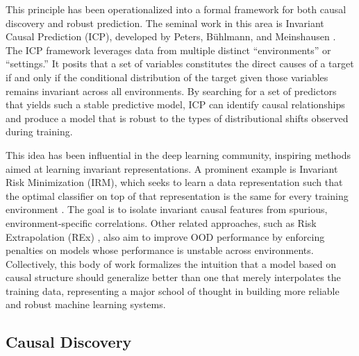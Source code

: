 {This principle has been operationalized into a formal framework for both causal discovery and robust prediction. The seminal work in this area is Invariant Causal Prediction (ICP), developed by Peters, Bühlmann, and Meinshausen \cite{peters2016invariant}. The ICP framework leverages data from multiple distinct ``environments'' or ``settings.'' It posits that a set of variables constitutes the direct causes of a target if and only if the conditional distribution of the target given those variables remains invariant across all environments. By searching for a set of predictors that yields such a stable predictive model, ICP can identify causal relationships and produce a model that is robust to the types of distributional shifts observed during training.

This idea has been influential in the deep learning community, inspiring methods aimed at learning invariant representations. A prominent example is Invariant Risk Minimization (IRM), which seeks to learn a data representation such that the optimal classifier on top of that representation is the same for every training environment \cite{arjovsky2019invariant}. The goal is to isolate invariant causal features from spurious, environment-specific correlations. Other related approaches, such as Risk Extrapolation (REx) \cite{krueger2021out}, also aim to improve OOD performance by enforcing penalties on models whose performance is unstable across environments. Collectively, this body of work formalizes the intuition that a model based on causal structure should generalize better than one that merely interpolates the training data, representing a major school of thought in building more reliable and robust machine learning systems.

\newpage

\subsection{Causal Discovery}

}
